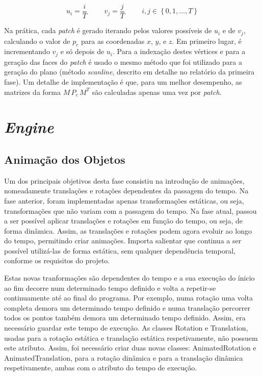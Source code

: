 \documentclass[12pt, a4paper]{article}
\begin{document}
$$
u_i = \frac{i}{T}
\hspace{1cm}
v_j = \frac{j}{T}
\hspace{1cm}
i, j \in \left \lbrace 0, 1, \ldots, T \right \rbrace
$$

Na prática, cada \emph{patch} é gerado iterando pelos valores possíveis de $u_i$ e de $v_j$,
calculando o valor de $p_c$ para as coordenadas $x$, $y$, e $z$. Em primeiro lugar, é incrementando
$v_j$ e só depois de $u_i$. Para a indexação destes vértices e para a geração das faces do
\emph{patch} é usado o mesmo método que foi utilizado para a geração do plano (método
\emph{scanline}, descrito em detalhe no relatório da primeira fase). Um detalhe de implementação é
que, para um melhor desempenho, as matrizes da forma $M \, P_c \, M^T$ são calculadas apenas uma vez
por \emph{patch}.

\section{\emph{Engine}}

\subsection{Animação dos Objetos}

Um dos principais objetivos desta fase consistiu na introdução de animações, nomeadamente
translações e rotações dependentes da passagem do tempo. Na fase anterior, foram implementadas
apenas transformações estáticas, ou seja, transformações que não variam com a passagem do tempo.
Na fase atual, passou a ser possível aplicar translações e rotações em função do tempo,
ou seja, de forma dinâmica. Assim, as translações e rotações podem agora evoluir ao longo do tempo,
permitindo criar animações. Importa salientar que continua a ser possível utilizá-las de forma
estática, sem qualquer dependência temporal, conforme os requisitos do projeto.

Estas novas tranformações são dependentes do tempo e a sua execução do ínicio ao fim decorre
num determinado tempo definido e volta a repetir-se continuamente até ao final do programa.
Por exemplo, numa rotação uma volta completa demora um determinado tempo definido e numa translação
percorrer todos os pontos também demora um determinado tempo definido. Assim, era necessário guardar
este tempo de execução. As classes Rotation e Translation, usadas para a rotação estática e
translação estática respetivamente, não possuem este atributo. Assim, foi necessário criar duas
novas classes: AnimatedRotation e AnimatedTranslation, para a rotação dinâmica e para a translação
dinâmica respetivamente, ambas com o atributo do tempo de execução.
\end{document}
